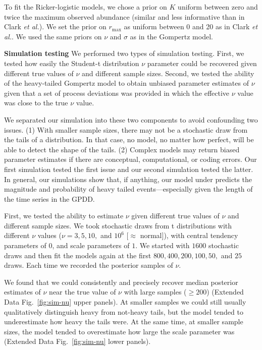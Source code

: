 To fit the Ricker-logistic models, we chose a prior on \(K\) uniform between zero and twice the maximum observed abundance (similar and less informative than in Clark \emph{et al.}\cite{clark2010}). We set the prior on \(r_\mathrm{max}\) as uniform between 0 and 20 as in Clark \emph{et al.}\cite{clark2010}. We used the same priors on \(\nu\) and \(\sigma\) as in the Gompertz model.

\textbf{Simulation testing} We performed two types of simulation testing. First, we tested how easily the Student-t distribution \(\nu\) parameter could be recovered given different true values of \(\nu\) and different sample sizes. Second, we tested the ability of the heavy-tailed Gompertz model to obtain unbiased parameter estimates of \(\nu\) given that a set of process deviations was provided in which the effective \(\nu\) value was close to the true \(\nu\) value.

We separated our simulation into these two components to avoid confounding two issues. (1) With smaller sample sizes, there may not be a stochastic draw from the tails of a distribution. In that case, no model, no matter how perfect, will be able to detect the shape of the tails. (2) Complex models may return biased parameter estimates if there are conceptual, computational, or coding errors. Our first simulation tested the first issue and our second simulation tested the latter. In general, our simulations show that, if anything, our model under predicts the magnitude and probability of heavy tailed events---especially given the length of the time series in the GPDD.

First, we tested the ability to estimate \(\nu\) given different true values of \(\nu\) and different sample sizes. We took stochastic draws from t distributions with different \(\nu\) values (\(\nu = 3, 5, 10,\) and \(10^6\) {[}\(\approx\) normal{]}), with central tendency parameters of \(0\), and scale parameters of \(1\). We started with \(1600\) stochastic draws and then fit the models again at the first \(800, 400, 200, 100, 50,\) and \(25\) draws. Each time we recorded the posterior samples of \(\nu\).

We found that we could consistently and precisely recover median posterior estimates of \(\nu\) near the true value of \(\nu\) with large samples (\(\ge 200\)) (Extended Data Fig.~\ref{fig:sim-nu} upper panels). At smaller samples we could still usually qualitatively distinguish heavy from not-heavy tails, but the model tended to underestimate how heavy the tails were. At the same time, at smaller sample sizes, the model tended to overestimate how large the scale parameter was (Extended Data Fig.~\ref{fig:sim-nu} lower panels).

